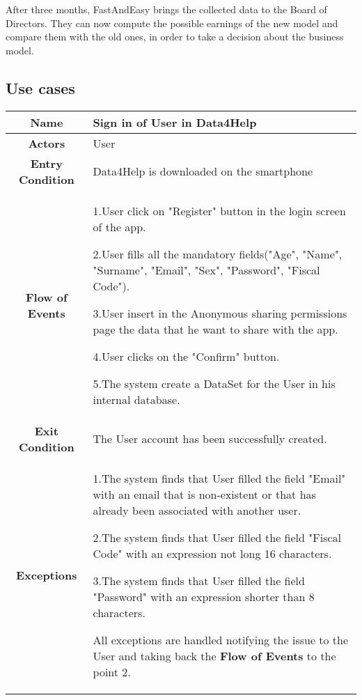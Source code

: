       After three months, FastAndEasy brings the collected data to the Board of Directors. They can now compute the possible earnings of the new model and compare them with the old ones, in order to take a decision about the business model.

  \subsection{Use cases}

        \begin{table}[h!]
        \centering
        \begin{tabularx}{\linewidth}{|c|X|}
          \hline
          \textbf{Name} & Sign in of User in Data4Help\\
        	\hline
        	\textbf{Actors} & User \\
        	\hline
        	\textbf{Entry Condition} & Data4Help is downloaded on the smartphone \\
        	\hline
        	\textbf{Flow of Events} & 1.User click on "Register" button in the login screen of the app.

        					2.User fills all the mandatory fields("Age", "Name", "Surname", "Email", "Sex", "Password", "Fiscal 							Code").

        					3.User insert in the Anonymous sharing permissions page the data that he want to share with 						the app.

        					4.User clicks on the "Confirm" button.

        					5.The system create a DataSet for the User in his internal database.\\
        	\hline
        	\textbf{Exit Condition} & The User account has been successfully created. \\
        	\hline
        	\textbf{Exceptions} &
        					1.The system finds that User filled the field "Email"  with an email that is non-existent or that has 							already been associated with another user.

        					2.The system finds that User filled the field "Fiscal Code" with an expression not long 16 								characters.

        					3.The system finds that User filled the field "Password" with an expression shorter than 8 								characters.

        					All exceptions are handled notifying the issue to the User and taking back the \textbf{Flow of 							Events} to the point 2.\\
       
   \hline

        \end{tabularx}

      \end{table}


